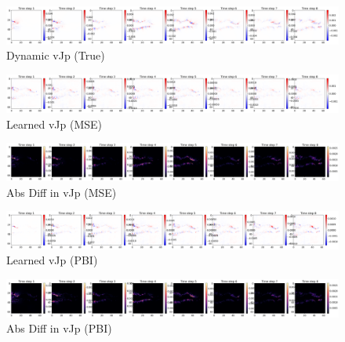 \documentclass[
]{article}
\begin{document}
\begin{figure}[H]

{\centering \includegraphics[width=1\textwidth,height=\textheight]{../../plot/GCS_channel_plot/training/JAC/true_vjp_1.png}

}

\caption{Dynamic vJp (True)}

\end{figure}%
\begin{figure}[H]

{\centering \includegraphics[width=1\textwidth,height=\textheight]{../../plot/GCS_channel_plot/training/MSE/learned_vjp_990.png}

}

\caption{Learned vJp (MSE)}

\end{figure}%
\begin{figure}[H]

{\centering \includegraphics[width=1\textwidth,height=\textheight]{../../plot/GCS_channel_plot/training/MSE/diff_vjp_990.png}

}

\caption{Abs Diff in vJp (MSE)}

\end{figure}%
\begin{figure}[H]

{\centering \includegraphics[width=1\textwidth,height=\textheight]{../../plot/GCS_channel_plot/training/JAC/learned_vjp_990.png}

}

\caption{Learned vJp (PBI)}

\end{figure}%
\begin{figure}[H]

{\centering \includegraphics[width=1\textwidth,height=\textheight]{../../plot/GCS_channel_plot/training/JAC/diff_vjp_990.png}

}

\caption{Abs Diff in vJp (PBI)}

\end{figure}%
\end{document}
